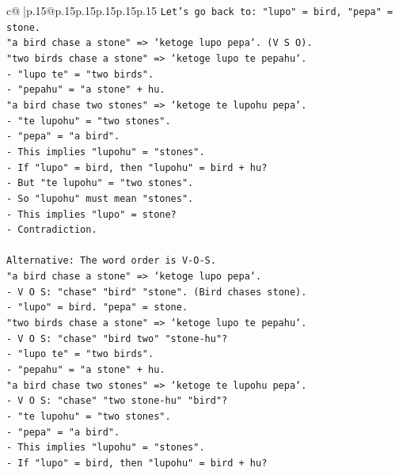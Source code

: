 \documentclass{article}
\begin{document}
{\begin{supertabular}{c@{$\;$}|p{.15\linewidth}@{}p{.15\linewidth}p{.15\linewidth}p{.15\linewidth}p{.15\linewidth}p{.15\linewidth}}
{{{\texttt{Let's go back to: "lupo" = bird, "pepa" = stone.} \\
\texttt{"a bird chase a stone" => `ketoge lupo pepa`. (V S O).} \\
\texttt{"two birds chase a stone" => `ketoge lupo te pepahu`.} \\
\texttt{{-} "lupo te" = "two birds".} \\
\texttt{{-} "pepahu" = "a stone" + hu.} \\
\texttt{"a bird chase two stones" => `ketoge te lupohu pepa`.} \\
\texttt{{-} "te lupohu" = "two stones".} \\
\texttt{{-} "pepa" = "a bird".} \\
\texttt{{-} This implies "lupohu" = "stones".} \\
\texttt{{-} If "lupo" = bird, then "lupohu" = bird + hu?} \\
\texttt{{-} But "te lupohu" = "two stones".} \\
\texttt{{-} So "lupohu" must mean "stones".} \\
\texttt{{-} This implies "lupo" = stone?} \\
\texttt{{-} Contradiction.} \\
\\ 
\texttt{Alternative: The word order is V{-}O{-}S.} \\
\texttt{"a bird chase a stone" => `ketoge lupo pepa`.} \\
\texttt{{-} V O S: "chase" "bird" "stone". (Bird chases stone).} \\
\texttt{{-} "lupo" = bird. "pepa" = stone.} \\
\texttt{"two birds chase a stone" => `ketoge lupo te pepahu`.} \\
\texttt{{-} V O S: "chase" "bird two" "stone{-}hu"?} \\
\texttt{{-} "lupo te" = "two birds".} \\
\texttt{{-} "pepahu" = "a stone" + hu.} \\
\texttt{"a bird chase two stones" => `ketoge te lupohu pepa`.} \\
\texttt{{-} V O S: "chase" "two stone{-}hu" "bird"?} \\
\texttt{{-} "te lupohu" = "two stones".} \\
\texttt{{-} "pepa" = "a bird".} \\
\texttt{{-} This implies "lupohu" = "stones".} \\
\texttt{{-} If "lupo" = bird, then "lupohu" = bird + hu?} \\
}}}
\end{supertabular}}
\end{document}
